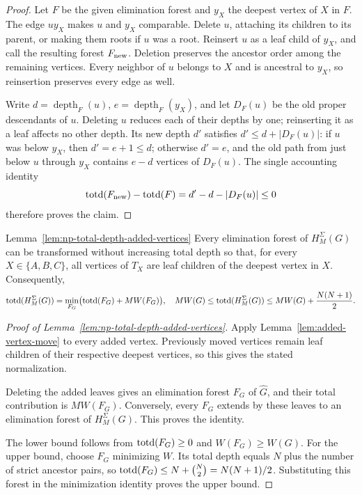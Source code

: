 \begin{proof}
Let $F$ be the given elimination forest and $y_X$ the deepest vertex
of $X$ in $F$. The edge $uy_X$ makes $u$
and $y_X$ comparable. Delete $u$, attaching its children to its
parent, or making them roots if $u$ was a root. Reinsert $u$ as a
leaf child of $y_X$, and call the resulting forest $F_{\rm new}$.
Deletion preserves the ancestor order among
the remaining vertices. Every neighbor of $u$ belongs to $X$ and
is ancestral to $y_X$, so reinsertion preserves every edge as well.

Write $d=\operatorname{depth}_F(u)$, $e=\operatorname{depth}_F(y_X)$,
and let $D_F(u)$ be the old proper descendants of $u$. Deleting $u$
reduces each of their depths by one; reinserting it as a leaf affects
no other depth. Its new depth $d'$ satisfies $d'\le d+|D_F(u)|$:
if $u$ was below $y_X$, then $d'=e+1\le d$; otherwise $d'=e$,
and the old path from just below $u$ through $y_X$ contains
$e-d$ vertices of $D_F(u)$. The single accounting identity
\[
 \operatorname{totd}(F_{\rm new})-\operatorname{totd}(F)=d'-d-|D_F(u)|\le0
\]
therefore proves the claim.
\end{proof}

\begin{restatedlemma}{Lemma~\ref{lem:np-total-depth-added-vertices}}
Every elimination forest of $H^\Sigma_M(G)$ can be transformed without
increasing total depth so that, for every $X\in\{A,B,C\}$, all
vertices of $T_X$ are leaf children of the deepest vertex in $X$.
Consequently,
\[
\operatorname{totd}(H^\Sigma_M(G))
 =\min_{F_G}\bigl(\operatorname{totd}(F_G)+MW(F_G)\bigr),\quad MW(G)
 \le\operatorname{totd}(H^\Sigma_M(G))
 \le MW(G)+\frac{N(N+1)}2.
\]
\end{restatedlemma}

\begin{proof}[Proof of Lemma~\ref{lem:np-total-depth-added-vertices}]
Apply Lemma~\ref{lem:added-vertex-move} to every added vertex.
Previously moved vertices remain leaf children of their respective
deepest vertices, so this gives the stated normalization.

Deleting the added leaves gives an elimination forest $F_G$ of
$\widehat G$, and their total contribution is $MW(F_G)$.
Conversely, every $F_G$ extends by these leaves to an elimination
forest of $H^\Sigma_M(G)$. This proves the identity.

The lower bound follows from $\operatorname{totd}(F_G)\geq0$ and
$W(F_G)\geq W(G)$. For the upper bound,
choose $F_G$ minimizing $W$. Its total depth equals $N$ plus the
number of strict ancestor pairs, so
$\operatorname{totd}(F_G)\leq N+\binom N2=N(N+1)/2$.
Substituting this forest in the minimization identity proves the
upper bound.
\end{proof}

